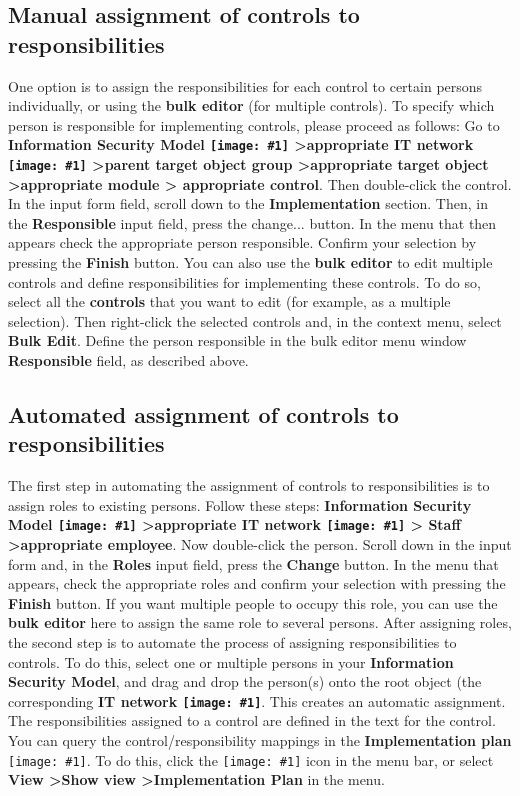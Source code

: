 \documentclass[a4paper,10pt]{book}
\newcommand{\icon}[1]{\texttt{[image: \#1]}}
\begin{document}
\subsection{Manual assignment of controls to responsibilities}
One option is to assign the responsibilities for each control to certain persons individually, or using the
\textbf{bulk editor} (for multiple controls). To specify which person is responsible for implementing controls,
please proceed as follows:
Go to \textbf{Information Security Model \icon{Icon/GS_Modell.png}
\textgreater appropriate IT network \icon{Icon/GS_Modell.png} \textgreater parent target object group
\textgreater appropriate target object \textgreater appropriate module \textgreater
appropriate control}. Then double-click the control. In the input form field, scroll down to the \textbf{Implementation}
section. Then, in the \textbf{Responsible} input field, press the change... button. In the menu that then appears check the
appropriate person responsible. Confirm your selection by pressing the \textbf{Finish} button.
\newline
You can also use the \textbf{bulk editor} to edit multiple controls and define responsibilities for implementing these controls.
To do so, select all the \textbf{controls} that you want to edit (for example, as a multiple selection). Then right-click the selected
controls and, in the context menu, select \textbf{Bulk Edit}. Define the person responsible in the bulk editor menu window
\textbf{Responsible} field, as described above.

\subsection{Automated assignment of controls to responsibilities}
The first step in automating the assignment of controls to responsibilities is to assign roles to existing persons.
Follow these steps:
\textbf{Information Security Model \icon{Icon/GS_Modell.png}
\textgreater appropriate IT network \icon{Icon/GS_Modell.png} \textgreater
Staff \textgreater appropriate employee}. Now double-click the person. Scroll down in the input form and, in the \textbf{Roles}
input field, press the \textbf{Change} button. In the menu that appears, check the appropriate roles and confirm your selection with pressing the
\textbf{Finish} button. If you want multiple people to occupy this role, you can use the \textbf{bulk editor}
here to assign the same role to several persons.
\newline
After assigning roles, the second step is to automate the process of assigning responsibilities to controls. To do this,
select one or multiple persons in your \textbf{Information Security Model}, and drag and drop the person(s) onto the root
object (the corresponding \textbf{IT network \icon{Icon/GS_Modell.png}}.
This creates an automatic assignment. The responsibilities assigned to a control are defined in the text for the control.
You can query the control/responsibility mappings in the \textbf{Implementation plan} \icon{Icon/Okay.png}.
To do this, click the \icon{Icon/Okay.png} icon in the menu bar, or select
\textbf{View \textgreater Show view \textgreater Implementation Plan} in the menu.
\end{document}
